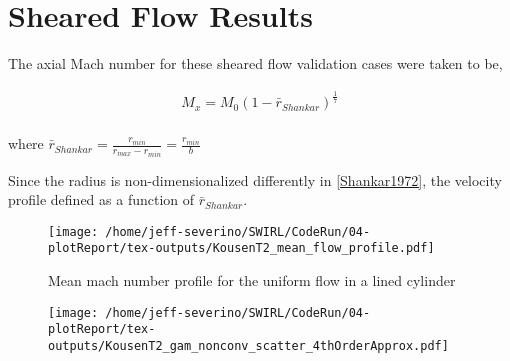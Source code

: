 \section{Sheared Flow Results}

The axial Mach number for these sheared flow validation cases were taken to be,

\begin{align}
    M_x = M_0 \left( 1 - \bar{r}_{Shankar} \right)^{ \frac{1}{7}}
    \label{eqn:cylindricalShear} \\
\end{align}

where $\bar{r}_{Shankar} = \frac{r_{min}}{r_{max}-r_{min}} = \frac{r_{min}}{b}$ 

Since the radius is non-dimensionalized differently in \ref{Shankar1972}, the 
velocity profile defined as a function of $\bar{r}_{Shankar}$.


\begin{figure}[h!]
    \centering
    \texttt{[image: /home/jeff-severino/SWIRL/CodeRun/04-plotReport/tex-outputs/KousenT2\_mean\_flow\_profile.pdf]}
    \caption{Mean mach number profile for the uniform flow in a lined cylinder}
    \label{fig:1}
\end{figure}

\begin{figure}[h!]
    \centering
    \texttt{[image: /home/jeff-severino/SWIRL/CodeRun/04-plotReport/tex-outputs/KousenT2\_gam\_nonconv\_scatter\_4thOrderApprox.pdf]}
\end{figure}


